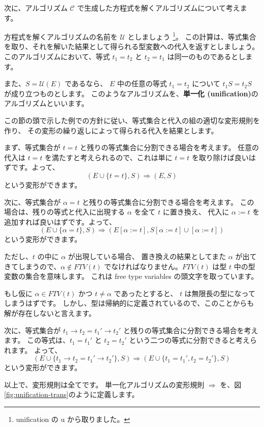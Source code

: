 次に、アルゴリズム $\mathcal C$ で生成した方程式を解くアルゴリズムについて考えます。

方程式を解くアルゴリズムの名前を $\mathcal U$ としましょう
\footnote{unification の u から取りました。}。
この計算は、等式集合を取り、それを解いた結果として得られる型変数への代入を返すとしましょう。
このアルゴリズムにおいて、等式 $t_1 = t_2$ と $t_2 = t_1$ は同一のものであるとします。

また、$S = \mathcal{U}(E)$ であるなら、
$E$ 中の任意の等式 $t_1 = t_2$ について $t_1 S = t_2 S$ が成り立つものとします。
このようなアルゴリズムを、\textbf{単一化 (unification)}のアルゴリズムといいます。

この節の頭で示した例での方針に従い、等式集合と代入の組の適切な変形規則を作り、
その変形の繰り返しによって得られる代入を結果とします。

まず、等式集合が $t = t$ と残りの等式集合に分割できる場合を考えます。
任意の代入は $t = t$ を満たすと考えられるので、これは単に $t = t$ を取り除けば良いはずです。よって、
\[
  (E \cup \{t = t\}, S) \Longrightarrow (E, S)
\]
という変形ができます。

次に、等式集合が $\alpha = t$ と残りの等式集合に分割できる場合を考えます。
この場合は、残りの等式と代入に出現する $\alpha$ を全て $t$ に置き換え、
代入に $\alpha := t$ を追加すれば良いはずです。よって、
\[
  (E \cup \{\alpha = t\}, S) \Longrightarrow (E[\alpha := t], S[\alpha := t] \cup [\alpha := t])
\]
という変形ができます。

ただし、$t$ の中に $\alpha$ が出現している場合、
置き換えの結果としてまた $\alpha$ が出てきてしまうので、$\alpha \notin \mathit{FTV}(t)$
でなければなりません。$\mathit{FTV}(t)$ は型 $t$ 中の型変数の集合を意味します。
これは free type variables の頭文字を取っています。

もし仮に $\alpha \in \mathit{FTV}(t)$ かつ $t \neq \alpha$ であったとすると、
$t$ は無限長の型になってしまうはずです。
しかし、型は帰納的に定義されているので、このことからも解が存在しないと言えます。

次に、等式集合が $t_1 \to t_2 = t_1' \to t_2'$ と残りの等式集合に分割できる場合を考えます。
この等式は、$t_1 = t_1'$ と $t_2 = t_2'$ という二つの等式に分割できると考えられます。
よって、
\[
  (E \cup \{t_1 \to t_2 = t_1' \to t_2'\}, S) \Longrightarrow (E \cup \{t_1 = t_1', t_2 = t_2'\}, S)
\]
という変形ができます。

以上で、変形規則は全てです。
単一化アルゴリズムの変形規則 $\Longrightarrow$ を、図\ref{fig:unification-trans}のように定義します。

